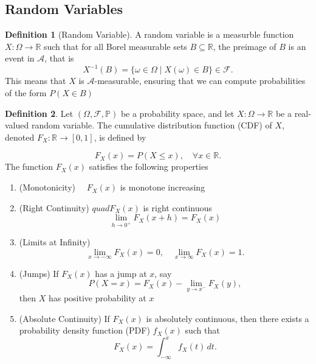\documentclass{article}
\theoremstyle{definition}
\newtheorem{definition}{Definition}[section]
\theoremstyle{remark}
\begin{document}
\subsection{Random Variables}



\begin{definition}[Random Variable] \label{def: Random_Variable}
A random variable is a measurble function $ X: \Omega \to \mathbb{R}$ such that for all Borel measurable sets $ B \subseteq \mathbb{R}$,
the preimage of $B$ is an event in $\mathcal{A}$, that is 
\[
X^{-1}(B) = \{ \omega \in \Omega \mid X(\omega) \in B \} \in \mathcal{F}.
\]
This means that $X$ is $\mathcal{A}$-measurable, ensuring that we can compute probabilities of the form $P(X \in B)$
\end{definition}




\begin{definition}
Let \( (\Omega, \mathcal{F}, \mathbb{P}) \) be a probability space, and let \( X: \Omega \to \mathbb{R} \) be a real-valued random variable. The cumulative distribution function (CDF) of \( X \), denoted \( F_X: \mathbb{R} \to [0,1] \), is defined by  

\[
F_X(x) = P(X \leq x), \quad \forall x \in \mathbb{R}.
\]
The function \( F_X(x) \) satisfies the following properties  
\begin{enumerate}
\item (Monotonicity) $\quad F_X(x)$ is monotone increasing
\item (Right Continuity) $quad F_X(x)$ is right continuous\[
\lim_{h\to 0^+} F_X(x+h) = F_X(x)
\]
\item (Limits at Infinity) \[
\lim_{x \to -\infty} F_X(x) = 0, \quad \lim_{x \to \infty} F_X(x) = 1.
\]  
\item (Jumps) If \( F_X(x) \) has a jump at \( x \), say  
\[
P(X = x) = F_X(x) - \lim_{y \to x^-} F_X(y),
\]  
then \( X \) has positive probability at \( x \)
\item (Absolute Continuity) If \( F_X(x) \) is absolutely continuous, then there exists a probability density function (PDF) \( f_X(x) \) such that  
\[
F_X(x) = \int_{-\infty}^{x} f_X(t) \, dt.
\]  
\end{enumerate} 
\end{definition}
\end{document}
